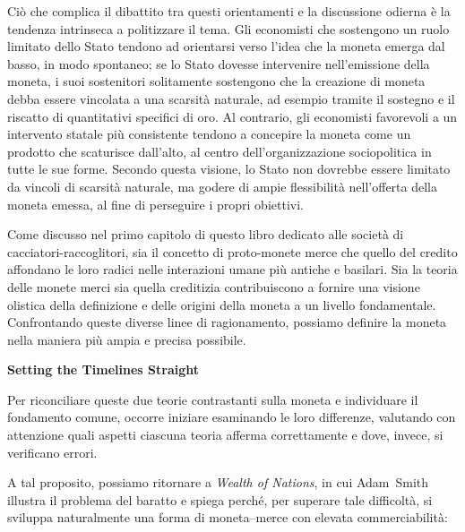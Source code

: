 \documentclass[
  a5paper,
  smalldemyvopaper,10pt,twoside,onecolumn,openright,extrafontsizes,hidelinks]{memoir}
\begin{document}
Ciò che complica il dibattito tra questi orientamenti e la discussione
odierna è la tendenza intrinseca a politizzare il tema. Gli economisti
che sostengono un ruolo limitato dello Stato tendono ad orientarsi verso
l'idea che la moneta emerga dal basso, in modo spontaneo; se lo Stato
dovesse intervenire nell'emissione della moneta, i suoi sostenitori
solitamente sostengono che la creazione di moneta debba essere vincolata
a una scarsità naturale, ad esempio tramite il sostegno e il riscatto di
quantitativi specifici di oro. Al contrario, gli economisti favorevoli a
un intervento statale più consistente tendono a concepire la moneta come
un prodotto che scaturisce dall'alto, al centro dell'organizzazione
sociopolitica in tutte le sue forme. Secondo questa visione, lo Stato
non dovrebbe essere limitato da vincoli di scarsità naturale, ma godere
di ampie flessibilità nell'offerta della moneta emessa, al fine di
perseguire i propri obiettivi.

Come discusso nel primo capitolo di questo libro dedicato alle società
di cacciatori-raccoglitori, sia il concetto di proto-monete merce che
quello del credito affondano le loro radici nelle interazioni umane più
antiche e basilari. Sia la teoria delle monete merci sia quella
creditizia contribuiscono a fornire una visione olistica della
definizione e delle origini della moneta a un livello fondamentale.
Confrontando queste diverse linee di ragionamento, possiamo definire la
moneta nella maniera più ampia e precisa possibile.

\textbf{Setting the Timelines Straight}

Per riconciliare queste due teorie contrastanti sulla moneta e
individuare il fondamento comune, occorre iniziare esaminando le loro
differenze, valutando con attenzione quali aspetti ciascuna teoria
afferma correttamente e dove, invece, si verificano errori.

A tal proposito, possiamo ritornare a \emph{Wealth of Nations}, in cui
Adam~Smith illustra il problema del baratto e spiega perché, per
superare tale difficoltà, si sviluppa naturalmente una forma di
moneta--merce con elevata commerciabilità:
\end{document}
